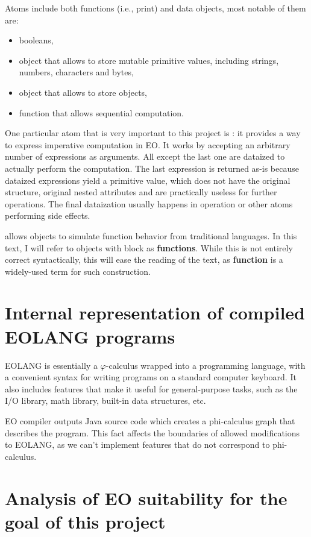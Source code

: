 Atoms include both functions (i.e., print) and data objects, most notable of them are:
\begin{itemize}
  \item booleans,
  \item {} object that allows to store mutable primitive values, including strings, numbers, characters and bytes,
  \item {} object that allows to store objects,
  \item {} function that allows sequential computation.
\end{itemize}

One particular atom that is very important to this project is : it provides a way to express imperative computation in EO. It works by accepting an arbitrary number of expressions as arguments. All except the last one are dataized to actually perform the computation. The last expression is returned as-is because dataized expressions yield a primitive value, which does not have the original structure, original nested attributes and are practically useless for further operations. The final dataization usually happens in  operation or other atoms performing side effects.

 allows objects to simulate function behavior from traditional languages. In this text, I will refer to objects with  block as \textbf{functions}. While this is not entirely correct syntactically, this will ease the reading of the text, as \textbf{function} is a widely-used term for such construction.


\section{Internal representation of compiled EOLANG programs}

EOLANG is essentially a $\varphi$-calculus wrapped into a programming language, with a convenient syntax for writing programs on a standard computer keyboard. It also includes features that make it useful for general-purpose tasks, such as the I/O library, math library, built-in data structures, etc.

EO compiler outputs Java source code which creates a phi-calculus graph that describes the program. This fact affects the boundaries of allowed modifications to EOLANG, as we can't implement features that do not correspond to phi-calculus.


\section{Analysis of EO suitability for the goal of this project}

